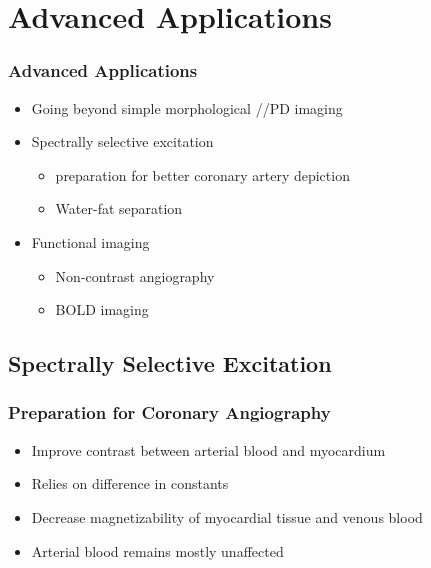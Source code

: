



\section{Advanced Applications} %
\label{sec:advanced_applications}

\begin{frame}
	\frametitle{Advanced Applications}
	
	\begin{itemize}
		\item Going beyond simple morphological \longtime{}/\transtime{}/PD imaging
		\item Spectrally selective excitation
		\begin{itemize}
			\item \transtime{} preparation for better coronary artery depiction
			\item Water-fat separation
		\end{itemize}
		\item Functional imaging
		\begin{itemize}
			\item Non-contrast angiography
			\item BOLD imaging
		\end{itemize}
	\end{itemize}
\end{frame}



\subsection{Spectrally Selective Excitation} %
\label{sub:spectrally_selective_excitation}

\begin{frame}
	\frametitle{\transtime{} Preparation for Coronary Angiography}
	
	\begin{itemize}
		\item Improve contrast between arterial blood and myocardium
		\item Relies on difference in \transtime{} constants
		\item Decrease magnetizability of myocardial tissue and venous blood
		\item Arterial blood remains mostly unaffected
	\end{itemize}
	
	\begin{center}
		
	\end{center}
\end{frame}

